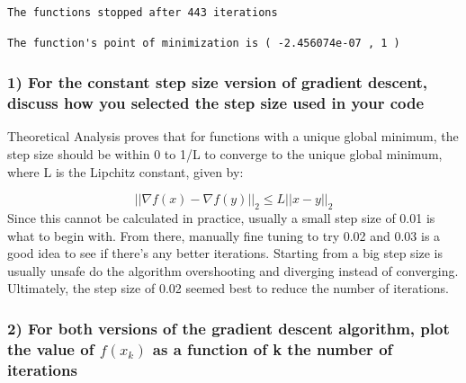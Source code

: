 \documentclass[
  letterpaper,
  DIV=11,
  numbers=noendperiod]{scrartcl}
\newenvironment{Shaded}{\begin{snugshade}}{\end{snugshade}}
\newcommand{\FunctionTok}[1]{\textcolor[rgb]{0.28,0.35,0.67}{#1}}
\newcommand{\NormalTok}[1]{\textcolor[rgb]{0.00,0.23,0.31}{#1}}
\newcommand{\SpecialCharTok}[1]{\textcolor[rgb]{0.37,0.37,0.37}{#1}}
\newcommand{\StringTok}[1]{\textcolor[rgb]{0.13,0.47,0.30}{#1}}
\begin{document}
\begin{verbatim}
The functions stopped after 443 iterations 
\end{verbatim}

\begin{Shaded}
\end{Shaded}

\begin{verbatim}
The function's point of minimization is ( -2.456074e-07 , 1 ) 
\end{verbatim}

\subsubsection{1) For the constant step size version of gradient
descent, discuss how you selected the step size used in your
code}\label{for-the-constant-step-size-version-of-gradient-descent-discuss-how-you-selected-the-step-size-used-in-your-code}

Theoretical Analysis proves that for functions with a unique global
minimum, the step size should be within 0 to 1/L to converge to the
unique global minimum, where L is the Lipchitz constant, given by:

\[
||∇f(x) - ∇f(y)||_2 \le L||x - y||_2
\] Since this cannot be calculated in practice, usually a small step
size of 0.01 is what to begin with. From there, manually fine tuning to
try 0.02 and 0.03 is a good idea to see if there's any better
iterations. Starting from a big step size is usually unsafe do the
algorithm overshooting and diverging instead of converging. Ultimately,
the step size of 0.02 seemed best to reduce the number of iterations.

\subsubsection{\texorpdfstring{2) For both versions of the gradient
descent algorithm, plot the value of \(f(x_k)\) as a function of k the
number of
iterations}{2) For both versions of the gradient descent algorithm, plot the value of f(x\_k) as a function of k the number of iterations}}\label{for-both-versions-of-the-gradient-descent-algorithm-plot-the-value-of-fx_k-as-a-function-of-k-the-number-of-iterations}
\end{document}
